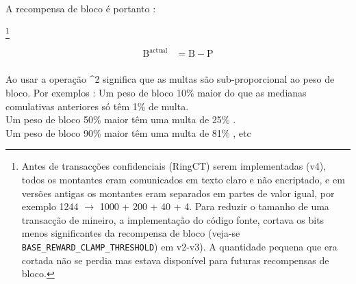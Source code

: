 A recompensa de bloco é portanto :


\footnote{Antes de transacções confidenciais (RingCT) serem implementadas (v4), todos os montantes eram comunicados em texto claro e não encriptado, e em versões antigas os montantes eram separados em partes de valor igual, por exemplo 1244 $\rightarrow$ 1000 + 200 + 40 + 4. Para reduzir o tamanho de uma transacção de mineiro, a implementação do código fonte, cortava os bits menos significantes da recompensa de bloco (veja-se {\tt BASE\_REWARD\_CLAMP\_THRESHOLD}) em v2-v3). A quantidade pequena que era cortada não se perdia mas estava disponível para futuras recompensas de bloco.}        

\begin{align*}
    \textrm{B}^{\textrm{actual}} &= \textrm{B} - \textrm{P} \\
\end{align*}

Ao usar a operação \^{}2 significa que as multas são sub-proporcional ao peso de bloco. Por exemplos :
Um peso de bloco 10\% maior do que as medianas comulativas anteriores só têm 1\% de multa.\\    
Um peso de bloco 50\% maior têm uma multa de 25\% .\\
Um peso de bloco 90\% maior têm uma multa de 81\% , etc \cite{monero-coin-emission}

